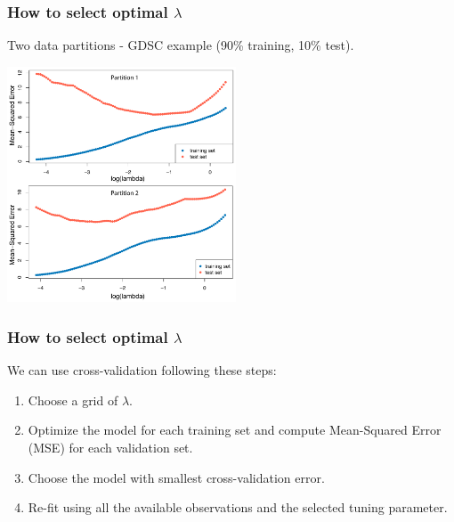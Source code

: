 \documentclass[notes]{beamer}          %
\begin{document}
\begin{frame}
\frametitle{How to select optimal $\lambda$}

Two data partitions - GDSC example (90\% training, 10\% test).

\begin{center}
\includegraphics[height=7cm]{../figures/week_2_linear_models/Lasso_MSE_train_test.pdf}
\end{center}
\end{frame}

\begin{frame}
\frametitle{How to select optimal $\lambda$}

We can use cross-validation following these steps:
\begin{enumerate}
  \item Choose a grid of $\lambda$.
  \item Optimize the model for each training set and compute Mean-Squared Error (MSE) for each validation set.
  \item Choose the model with smallest cross-validation error.
  \item Re-fit using all the available observations and the selected tuning parameter.
\end{enumerate}

\end{frame}
\end{document}
